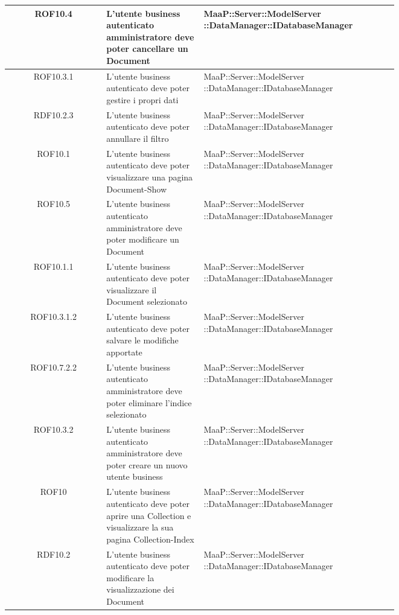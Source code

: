 \begin{center}
\begin{longtable}{|c|p{0.25\linewidth}|p{0.5\linewidth}|}
\midrule
ROF10.4
& L'utente business autenticato amministratore deve poter cancellare un Document
& MaaP::Server::ModelServer ::DataManager::IDatabaseManager\\

\midrule
ROF10.3.1
& L'utente business autenticato deve poter gestire i propri dati
& MaaP::Server::ModelServer ::DataManager::IDatabaseManager\\

\midrule
RDF10.2.3
& L'utente business autenticato deve poter annullare il filtro
& MaaP::Server::ModelServer ::DataManager::IDatabaseManager\\

\midrule
ROF10.1
& L'utente business autenticato deve poter visualizzare una pagina Document-Show
& MaaP::Server::ModelServer ::DataManager::IDatabaseManager\\

\midrule
ROF10.5
& L'utente business autenticato amministratore deve poter modificare un Document
& MaaP::Server::ModelServer ::DataManager::IDatabaseManager\\

\midrule
ROF10.1.1
& L'utente business autenticato deve poter visualizzare il Document selezionato
& MaaP::Server::ModelServer ::DataManager::IDatabaseManager\\

\midrule
ROF10.3.1.2
& L'utente business autenticato deve poter  salvare le modifiche apportate
& MaaP::Server::ModelServer ::DataManager::IDatabaseManager\\

\midrule
ROF10.7.2.2
& L'utente business autenticato amministratore deve poter eliminare l'indice selezionato
& MaaP::Server::ModelServer ::DataManager::IDatabaseManager\\

\midrule
ROF10.3.2
& L'utente business autenticato amministratore deve poter creare un nuovo utente business
& MaaP::Server::ModelServer ::DataManager::IDatabaseManager\\

\midrule
ROF10
& L'utente business autenticato deve poter aprire una Collection e visualizzare la sua pagina Collection-Index
& MaaP::Server::ModelServer ::DataManager::IDatabaseManager\\

\midrule
RDF10.2
& L'utente business autenticato deve poter modificare la visualizzazione dei Document
& MaaP::Server::ModelServer ::DataManager::IDatabaseManager\\


\end{longtable}
\end{center}
